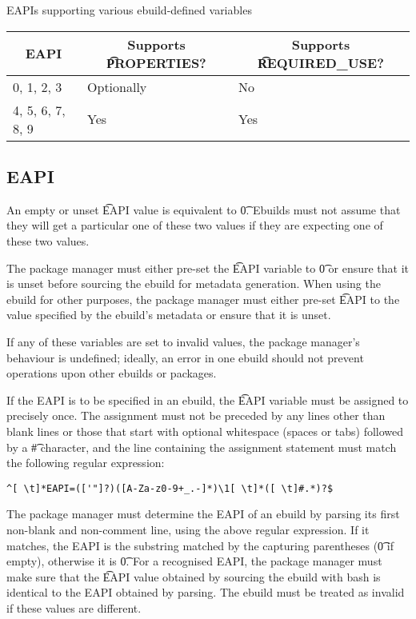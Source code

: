 \begin{centertable}{EAPIs supporting various ebuild-defined variables}
    \label{tab:optional-vars-table}
    \begin{tabular}{lll}
      \toprule
      \multicolumn{1}{c}{\textbf{EAPI}} &
      \multicolumn{1}{c}{\textbf{Supports \t{PROPERTIES}?}} &
      \multicolumn{1}{c}{\textbf{Supports \t{REQUIRED_USE}?}} \\
      \midrule
      0, 1, 2, 3        & Optionally & No  \\
      4, 5, 6, 7, 8, 9  & Yes        & Yes \\
      \bottomrule
    \end{tabular}
\end{centertable}

\subsection{EAPI}
\label{sec:eapi}

An empty or unset \t{EAPI} value is equivalent to \t{0}. Ebuilds must not assume that they will get
a particular one of these two values if they are expecting one of these two values.

The package manager must either pre-set the \t{EAPI} variable to \t{0} or ensure that it is unset
before sourcing the ebuild for metadata generation. When using the ebuild for other purposes, the
package manager must either pre-set \t{EAPI} to the value specified by the ebuild's metadata or
ensure that it is unset.

If any of these variables are set to invalid values, the package manager's behaviour is undefined;
ideally, an error in one ebuild should not prevent operations upon other ebuilds or packages.

If the EAPI is to be specified in an ebuild, the \t{EAPI} variable must be assigned to precisely
once. The assignment must not be preceded by any lines other than blank lines or those that start
with optional whitespace (spaces or tabs) followed by a \t{\#} character, and the line containing
the assignment statement must match the following regular expression:
\begin{verbatim}
^[ \t]*EAPI=(['"]?)([A-Za-z0-9+_.-]*)\1[ \t]*([ \t]#.*)?$
\end{verbatim}

The package manager must determine the EAPI of an ebuild by parsing its first non-blank and
non-comment line, using the above regular expression. If it matches, the EAPI is the substring
matched by the capturing parentheses (\t{0} if empty), otherwise it is \t{0}. For a recognised
EAPI, the package manager must make sure that the \t{EAPI} value obtained by sourcing the ebuild
with bash is identical to the EAPI obtained by parsing. The ebuild must be treated as invalid if
these values are different.

